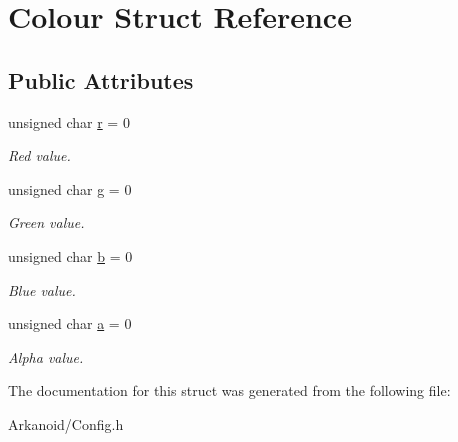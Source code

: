 \hypertarget{struct_colour}{}\section{Colour Struct Reference}
\label{struct_colour}
\subsection*{Public Attributes}
\begin{DoxyCompactItemize}
\item 
\mbox{\label{struct_colour_ab0086c8227aa6faa9b1e5ec4f9a9e3ee}} 
unsigned char \hyperlink{struct_colour_ab0086c8227aa6faa9b1e5ec4f9a9e3ee}{r} = 0
\begin{DoxyCompactList}\small\item\em Red value. \end{DoxyCompactList}\item 
\mbox{\label{struct_colour_a8f883cd0fbcae4be7611283083c4131f}} 
unsigned char \hyperlink{struct_colour_a8f883cd0fbcae4be7611283083c4131f}{g} = 0
\begin{DoxyCompactList}\small\item\em Green value. \end{DoxyCompactList}\item 
\mbox{\label{struct_colour_aca50ca8192a7538e0aaa2428ac84442a}} 
unsigned char \hyperlink{struct_colour_aca50ca8192a7538e0aaa2428ac84442a}{b} = 0
\begin{DoxyCompactList}\small\item\em Blue value. \end{DoxyCompactList}\item 
\mbox{\label{struct_colour_a3dfbe5a33ed2f27365e2f22c669d29f2}} 
unsigned char \hyperlink{struct_colour_a3dfbe5a33ed2f27365e2f22c669d29f2}{a} = 0
\begin{DoxyCompactList}\small\item\em Alpha value. \end{DoxyCompactList}\end{DoxyCompactItemize}


The documentation for this struct was generated from the following file\+:\begin{DoxyCompactItemize}
\item 
Arkanoid/Config.\+h\end{DoxyCompactItemize}

